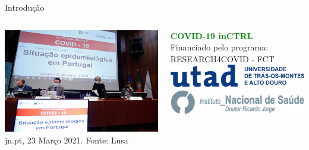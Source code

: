 \documentclass[pdf]
{beamer}
\begin{document}
\begin{frame}{Introdução}
\begin{columns}
	\begin{column}[T]{0.65\textwidth}
		\vspace{1.5cm}
		\centering
		\includegraphics[width=\textwidth]{Imagens/Reunioes_Infarmed.jpg}\\
		\hfill \textcolor{ExecusharesGrey}{\tiny jn.pt, 23 Março 2021. Fonte: Lusa}
	\end{column}
	
	\begin{column}[T]{0.35\textwidth}
		\vspace{0.5cm}
		\textcolor {green}{\Large\textbf{COVID-19 inCTRL}}\\
		\vspace{-0.2cm}
		\textcolor{ExecusharesGrey}{\tiny\hspace{1em}Financiado pelo programa:}\\
		\vspace{-0.2cm}
		\textcolor{ExecusharesGrey}{\tiny\hspace{1em}RESEARCH4COVID - FCT}\\
		\vspace{0.5cm}
		\includegraphics[width=\textwidth]{Imagens/logo_utad_completo_azul.png}\\
		\vspace{0.3cm}
		\includegraphics[width=\textwidth]{Imagens/logoentidade_INSA.png}\\
	\end{column}
\end{columns}
\end{frame}
\end{document}

